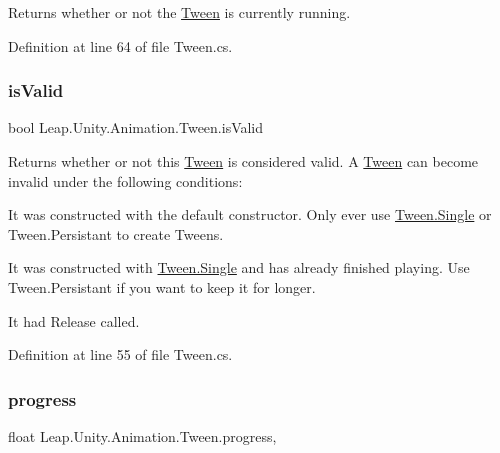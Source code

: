 Returns whether or not the \mbox{\hyperlink{struct_leap_1_1_unity_1_1_animation_1_1_tween}{Tween}} is currently running. 



Definition at line 64 of file Tween.\+cs.

\mbox{\label{struct_leap_1_1_unity_1_1_animation_1_1_tween_a9a3bab65cf734fb04f4c7c7525719891}} 
\subsubsection{\texorpdfstring{isValid}{isValid}}
{\footnotesize\ttfamily bool Leap.\+Unity.\+Animation.\+Tween.\+is\+Valid\hspace{0.3cm}{\ttfamily [get]}}



Returns whether or not this \mbox{\hyperlink{struct_leap_1_1_unity_1_1_animation_1_1_tween}{Tween}} is considered valid. A \mbox{\hyperlink{struct_leap_1_1_unity_1_1_animation_1_1_tween}{Tween}} can become invalid under the following conditions\+: 


\begin{DoxyItemize}
\item It was constructed with the default constructor. Only ever use \mbox{\hyperlink{struct_leap_1_1_unity_1_1_animation_1_1_tween_a7238365f2fb16c95082dc5d71b8f5139}{Tween.\+Single}} or Tween.\+Persistant to create Tweens.
\item It was constructed with \mbox{\hyperlink{struct_leap_1_1_unity_1_1_animation_1_1_tween_a7238365f2fb16c95082dc5d71b8f5139}{Tween.\+Single}} and has already finished playing. Use Tween.\+Persistant if you want to keep it for longer.
\item It had Release called. 
\end{DoxyItemize}

Definition at line 55 of file Tween.\+cs.

\mbox{\label{struct_leap_1_1_unity_1_1_animation_1_1_tween_ae0123854170a23519792c97c8620645c}} 
\subsubsection{\texorpdfstring{progress}{progress}}
{\footnotesize\ttfamily float Leap.\+Unity.\+Animation.\+Tween.\+progress\hspace{0.3cm}{\ttfamily [get]}, {\ttfamily [set]}}




